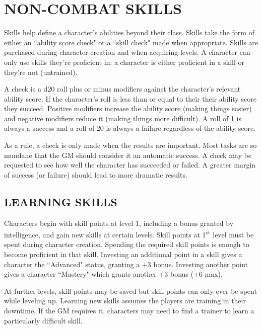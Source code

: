 \chapter{NON-COMBAT SKILLS}

\begin{multicols}{2}

Skills help define a character's abilities beyond their class.  Skills take the form of either an ``ability score check" or a ``skill check" made when appropriate.  Skills are purchased during character creation and when acquiring levels.  A character can only use skills they're proficient in: a character is either proficient in a skill or they're not (untrained).

A check is a d20 roll plus or minus modifiers against the character's relevant ability score.  If the character's roll is less than or equal to their their ability score they succeed.  Positive modifiers increase the ability score (making things easier) and negative modifiers reduce it (making things more difficult).  A roll of 1 is always a success and a roll of 20 is always a failure regardless of the ability score.  

As a rule, a check is only made when the results are important.  Most tasks are so mundane that the GM should consider it an automatic success.  A check may be requested to see how well the character has succeeded or failed.  A greater margin of success (or failure) should lead to more dramatic results.

\section{LEARNING SKILLS}

Characters begin with skill points at level 1, including a bonus granted by intelligence, and gain new skills at certain levels.  Skill points at 1\textsuperscript{st} level must be spent during character creation.  Spending the required skill points is enough to become proficient in that skill.  Investing an additional point in a skill gives a character the ``Advanced" status, granting a +3 bonus.  Investing another point gives a character ``Mastery" which grants another +3 bonus (+6 max).  

At further levels, skill points may be saved but skill points can only ever be spent while leveling up.  Learning new skills assumes the players are training in their downtime.  If the GM requires it, characters may need to find a trainer to learn a particularly difficult skill.


\end{multicols}
